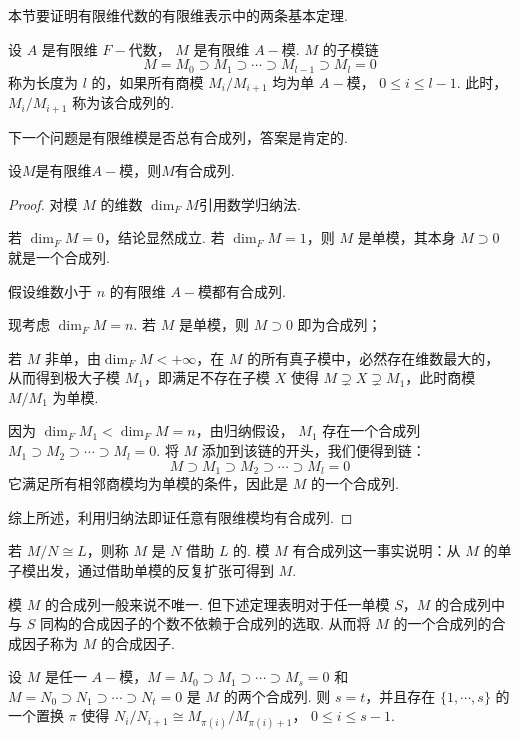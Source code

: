 本节要证明有限维代数的有限维表示中的两条基本定理.

\begin{definition}[合成列]
    设 $A$ 是有限维 $F-\!\!$代数， $M$ 是有限维 $A-\!\!$模. $M$ 的子模链
\[ M = M_0 \supset M_1 \supset \cdots \supset M_{l-1} \supset M_l = 0 \]
称为长度为 $l$ 的，如果所有商模 $M_i/M_{i+1}$ 均为单 $A-\!\!$模， $0 \leq i \leq l-1$. 此时， $M_i/M_{i+1}$ 称为该合成列的.
\end{definition}

下一个问题是有限维模是否总有合成列，答案是肯定的.
\begin{lemma}
    设$M$是有限维$A-\!\!$模，则$M$有合成列.
\end{lemma}

\begin{proof}
    对模 $M$ 的维数 $\dim_F M$引用数学归纳法.\par
    若 $\dim_F M = 0$，结论显然成立. 若 $\dim_F M = 1$，则 $M$ 是单模，其本身 $M \supset 0$ 就是一个合成列.\par
    假设维数小于 $n$ 的有限维 $A-\!\!$模都有合成列.\par
    现考虑 $\dim_F M = n$. 若 $M$ 是单模，则 $M \supset 0$ 即为合成列；\par
    若 $M$ 非单，由$\dim_F M < +\infty$，在 $M$ 的所有真子模中，必然存在维数最大的，从而得到极大子模 $M_1$，即满足不存在子模 $X$ 使得 $M \supsetneq X \supsetneq M_1$，此时商模 $M/M_1$ 为单模.\par
    因为 $\dim_F M_1 < \dim_F M = n$，由归纳假设， $M_1$ 存在一个合成列 $M_1 \supset M_2 \supset \cdots \supset M_l = 0$. 将 $M$ 添加到该链的开头，我们便得到链：
    \[ M \supset M_1 \supset M_2 \supset \cdots \supset M_l = 0 \]
    它满足所有相邻商模均为单模的条件，因此是 $M$ 的一个合成列.\par
    综上所述，利用归纳法即证任意有限维模均有合成列.
\end{proof}

若 $M/N \cong L$，则称 $M$ 是 $N$ 借助 $L$ 的. 模 $M$ 有合成列这一事实说明：从 $M$ 的单子模出发，通过借助单模的反复扩张可得到 $M$.

模 $M$ 的合成列一般来说不唯一. 但下述定理表明对于任一单模 $S$，$M$ 的合成列中与 $S$ 同构的合成因子的个数不依赖于合成列的选取. 从而将 $M$ 的一个合成列的合成因子称为 $M$ 的合成因子.

\begin{theorem}
设 $M$ 是任一 $A-\!\!$模，$M = M_0 \supset M_1 \supset \cdots \supset M_s = 0$ 和 $M = N_0 \supset N_1 \supset \cdots \supset N_t = 0$ 是 $M$ 的两个合成列. 则 $s = t$，并且存在 $\{1,\cdots,s\}$ 的一个置换 $\pi$ 使得 $N_i/N_{i+1} \cong M_{\pi(i)}/M_{\pi(i)+1}$， $0 \le i \le s-1$.
\end{theorem}

